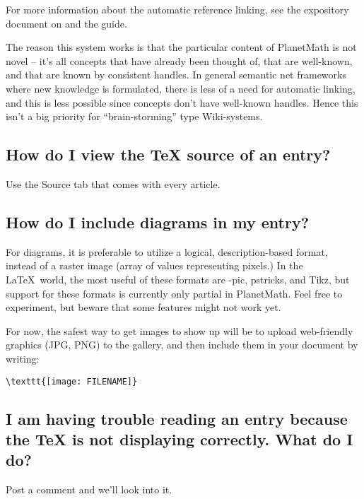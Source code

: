 For more information about the automatic reference linking, see the expository document on  and the  guide.

The reason this system works is that the particular content of PlanetMath is not novel -- it's all concepts that have already been thought of, that are well-known, and that are known by consistent handles. In general semantic net frameworks where new knowledge is formulated, there is less of a need for automatic linking, and this is less possible since concepts don't have well-known handles. Hence this isn't a big priority for ``brain-storming'' type Wiki-systems.

\subsection{How do I view the \TeX{} source of an entry?}
Use the Source tab that comes with every article.

\subsection{How do I include diagrams in my entry?}
For diagrams, it is preferable to utilize a logical, description-based format, instead of a raster image (array of values representing pixels.)  In the \LaTeX\ world, the most useful of these formats are \Xy-pic, pstricks, and Tikz, but support for these formats is currently only partial in PlanetMath.  Feel free to experiment, but beware that some features might not work yet.

For now, the safest way to get images to show up will be to upload web-friendly graphics (JPG, PNG) to the gallery, and then include them in your document by writing:
\begin{verbatim}
\texttt{[image: FILENAME]}
\end{verbatim}

\subsection{I am having trouble reading an entry because the \TeX{} is not displaying correctly.  What do I do?}
Post a comment and we'll look into it.
